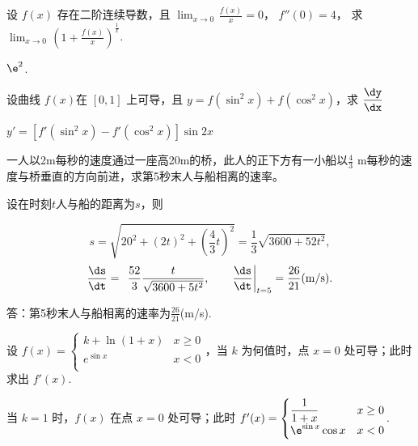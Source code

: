 \begin{problem} 设 $f(x)$ 存在二阶连续导数，且
$\displaystyle \lim_{x \rightarrow 0}\mspace{2mu}\frac{f\left( x \right)}{x} = 0$，
$f''\left( 0 \right) = 4$， 求
$\displaystyle \lim_{x \rightarrow 0}\mspace{2mu}\left( 1 + \frac{f(x)}{x} \right)^{\frac{1}{x}}$.

\begin{solution}
	$\e^2$.
\end{solution}

\end{problem}

\begin{problem}
	设曲线 $f(x)$在 $\left[ 0,1\right]$ 上可导，且
	$y = f\left( \sin^{2}x \right) + f(\cos^{2}x)$，求
	$\displaystyle \frac{{\dy}}{\dx}$


\begin{solution}
$y' = \left[ f'(\sin^{2}x) - f'\left( \cos^{2}x \right) \right]\sin{2x}$
\end{solution}


\end{problem}



\begin{problem}一人以2m每秒的速度通过一座高20m的桥，此人的正下方有一小船以$\displaystyle \frac{4}{3}$
m每秒的速度与桥垂直的方向前进，求第5秒末人与船相离的速率。

\begin{solution}
	设在时刻$t$人与船的距离为$s$，则

$$
s = \sqrt{20^{2} + (2t)^{2} + \left( \frac{4}{3}t \right)^{2}} = \frac{1}{3}\sqrt{3600 + 52t^{2}}, $$
$$\frac{{\ds}}{{\dt}} = \left. \ \frac{52}{3}\frac{t}{\sqrt{3600 + 5t^{2}}},\qquad \frac{{\ds}}{{\dt}} \right|_{t = 5} = \frac{26}{21}(\text{m/s}).
$$

答：第5秒末人与船相离的速率为$\displaystyle \frac{26}{21}$(m/s).
\end{solution}


\end{problem}           

\begin{problem} 设 $f(x) = \begin{cases}
k + \ln(1 + x) & x \geq 0 \\
e^{\sin x} & x < 0 \\
\end{cases} $，当 $k$ 为何值时，点 $x = 0$
处可导；此时求出 $f'(x)$.

\begin{solution}
	当 $k = 1$ 时，$f(x)$ 在点 $x = 0$ 处可导；此时
$f'(x) = \begin{cases}
\displaystyle \frac{1}{1 + x} & x \geq 0 \\
\e^{\sin x}\cos x & x < 0 \\
\end{cases} $.
\end{solution}


\end{problem}           

